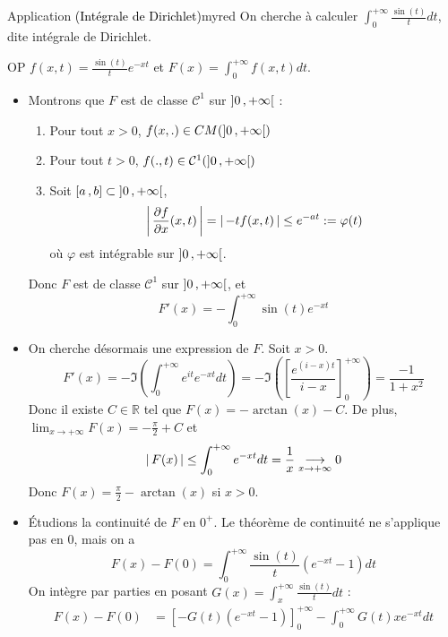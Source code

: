     \begin{omed}{Application \textcolor{black}{(Intégrale de Dirichlet)}}{myred}
        On cherche à calculer $\int_{0}^{+\infty} \frac{\sin(t)}{t} dt$, dite intégrale de Dirichlet.

        OP $f(x,t) = \frac{\sin(t)}{t} e^{-xt}$ et $F(x) = \int_{0}^{+\infty} f(x,t) dt$.

        \begin{itemize}
            \item Montrons que $F$ est de classe $\mathcal{C}^1$ sur $\left] 0 \, , +\infty \right[$ :
            \begin{enumerate}
                \item Pour tout $x > 0$, $f(x,.) \in CM(\left] 0 \, , +\infty \right[)$
                \item Pour tout $t > 0$, $f(.,t) \in \mathcal{C}^1(\left] 0 \, , +\infty \right[)$
                \item Soit $\left[ a \, , b \right] \subset \left] 0 \, , +\infty \right[$, 
                \[ \left\lvert \,\frac{\partial f}{\partial x}(x,t) \, \right\rvert = \left\lvert \,-t f(x,t) \, \right\rvert \leq e^{-at} := \varphi(t) \]
                où $\varphi$ est intégrable sur $\left] 0 \, , +\infty \right[$.
            \end{enumerate}
            Donc $F$ est de classe $\mathcal{C}^1$ sur $\left] 0 \, , +\infty \right[$, et 
            \[ F'(x) = - \int_{0}^{+\infty} \sin(t) e^{-xt} \]   
            \item On cherche désormais une expression de $F$. Soit $x > 0$.
            \[ F'(x) = - \Im\left(\int_{0}^{+\infty} e^{it} e^{-xt} dt\right) = - \Im\left(\left[\frac{e^{(i-x)t}}{i-x}\right]_0^{+\infty}\right) = \frac{-1}{1 + x^2} \]
            Donc il existe $C \in \mathbb{R}$ tel que $F(x) = - \arctan(x) - C$. De plus, $\lim_{x \to +\infty} F(x) = -\frac{\pi}{2} + C$ et 
            \[ \left\lvert \,F(x) \, \right\rvert \leq \int_{0}^{+\infty} e^{-xt} dt = \frac{1}{x} \underset{x \rightarrow +\infty}{\longrightarrow} 0 \]   
            Donc $F(x) = \frac{\pi}{2} - \arctan(x)$ si $x > 0$.
            \item Étudions la continuité de $F$ en $0^+$. Le théorème de continuité ne s’applique pas en $0$, mais on a 
            \[ F(x) - F(0) = \int_{0}^{+\infty} \frac{\sin(t)}{t} (e^{-xt} - 1) dt \]   
            On intègre par parties en posant $G(x) = \int_{x}^{+\infty} \frac{\sin(t)}{t}dt$ :
            \begin{align*}
                F(x) - F(0) 
                &= \left[-G(t)(e^{-xt} - 1)\right]_0^{+\infty} - \int_{0}^{+\infty} G(t) x e^{-xt} dt \\

\end{align*}
\end{itemize}
\end{omed}
